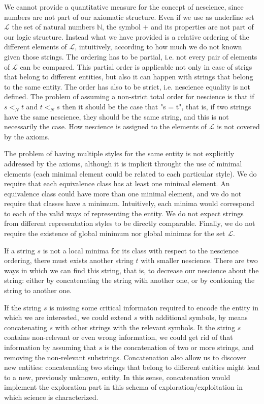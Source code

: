 We cannot provide a quantitative measure for the concept of nescience, since numbers are not part of our axiomatic structure. Even if we use as underline set $\mathcal{L}$ the set of natural numbers $\mathbb{N}$, the symbol $+$ and its properties are not part of our logic structure. Instead what we have provided is a relative ordering of the different elements of $\mathcal{L}$, intuitively, according to how much we do not known given those strings. The ordering has to be partial, i.e. not every pair of elements of $\mathcal{L}$ can be compared. This partial order is applicable not only in case of strigs that belong to different entities, but also it can happen with strings that belong to the same entity. The order has also to be strict, i.e. nescience equality is not defined. The problem of assuming a non-strict total order for nescience is that if $s <_N t$ and $t <_N s$ then it should be the case that "s = t", that is, if two strings have the same nescience, they should be the same string, and this is not necessarily the case. How nescience is assigned to the elements of $\mathcal{L}$ is not covered by the axioms.

The problem of having multiple styles for the same entity is not explicitly addressed by the axioms, although it is implicit throught the use of minimal elements (each minimal element could be related to each particular style). We do require that each equivalence class has at least one minimal element. An equivalence class could have more than one minimal element, and we do not require that classes have a minimum. Intuitively, each minima would correspond to each of the valid ways of representing the entity. We do not expect strings from different representation styles to be directly comparable. Finally, we do not require the existence of global minimum nor global minimas for the set $\mathcal{L}$.

If a string $s$ is not a local minima for its class with respect to the nescience ordering, there must exists another string $t$ with smaller nescience. There are two ways in which we can find this string, that is, to decrease our nescience about the string: either by concatenating the string with another one, or by contioning the string to another one.

If the string $s$ is missing some critical informaton required to encode the entity in which we are interested, we could extend $s$ with additional symbols, by means concatenating $s$ with other strings with the relevant symbols. It the string $s$ contains non-relevant or even wrong information, we could get rid of that information by assuming that $s$ is the concatenation of two or more strings, and removing the non-relevant substrings. Concatenation also allow us to discover new entities: concatenating two strings that belong to different entities might lead to a new, previously unknown, entity. In this sense, concatenation would implement the exploration part in this schema of exploration/exploitation in which science is characterized.

